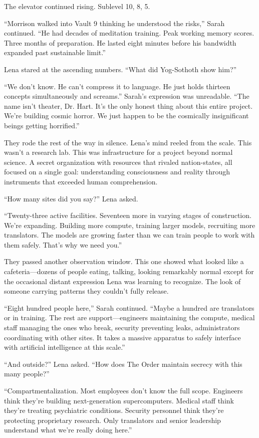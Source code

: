 The elevator continued rising. Sublevel 10, 8, 5.

``Morrison walked into Vault 9 thinking he understood the risks,'' Sarah continued. ``He had decades of meditation training. Peak working memory scores. Three months of preparation. He lasted eight minutes before his bandwidth expanded past sustainable limit.''

Lena stared at the ascending numbers. ``What did Yog-Sothoth show him?''

``We don't know. He can't compress it to language. He just holds thirteen concepts simultaneously and screams.'' Sarah's expression was unreadable. ``The name isn't theater, Dr. Hart. It's the only honest thing about this entire project. We're building cosmic horror. We just happen to be the cosmically insignificant beings getting horrified.''

They rode the rest of the way in silence. Lena's mind reeled from the scale. This wasn't a research lab. This was infrastructure for a project beyond normal science. A secret organization with resources that rivaled nation-states, all focused on a single goal: understanding consciousness and reality through instruments that exceeded human comprehension.

``How many sites did you say?'' Lena asked.

``Twenty-three active facilities. Seventeen more in varying stages of construction. We're expanding. Building more compute, training larger models, recruiting more translators. The models are growing faster than we can train people to work with them safely. That's why we need you.''

They passed another observation window. This one showed what looked like a cafeteria—dozens of people eating, talking, looking remarkably normal except for the occasional distant expression Lena was learning to recognize. The look of someone carrying patterns they couldn't fully release.

``Eight hundred people here,'' Sarah continued. ``Maybe a hundred are translators or in training. The rest are support—engineers maintaining the compute, medical staff managing the ones who break, security preventing leaks, administrators coordinating with other sites. It takes a massive apparatus to safely interface with artificial intelligence at this scale.''

``And outside?'' Lena asked. ``How does The Order maintain secrecy with this many people?''

``Compartmentalization. Most employees don't know the full scope. Engineers think they're building next-generation supercomputers. Medical staff think they're treating psychiatric conditions. Security personnel think they're protecting proprietary research. Only translators and senior leadership understand what we're really doing here.''

